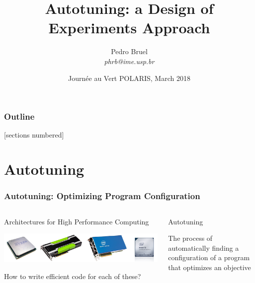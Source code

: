 \documentclass[10pt, compress, aspectratio=169, xcolor={table,usenames,dvipsnames}]{beamer}
\title{Autotuning: a Design of Experiments Approach}
\author{\footnotesize Pedro Bruel \\ {\scriptsize \emph{phrb@ime.usp.br}}}
\date{\scriptsize Journée au Vert POLARIS, March 2018}
\begin{document}
\maketitle

\begin{frame}
    \frametitle{Outline}
    [sections numbered]
    \tableofcontents[hideallsubsections]
\end{frame}

\section{Autotuning}

\begin{frame}
    \frametitle{Autotuning: Optimizing Program Configuration}
    \begin{columns}[c]
            \begin{block}{Architectures for High Performance Computing}
                \begin{center}
                    \includegraphics[width=\columnwidth]{architectures}
                \end{center}

                How to write \alert{efficient code} for each of these?
            \end{block}

            \begin{block}{Autotuning}

                \vspace{.2cm}

                The process of \alert{automatically finding} a
                \alert{configuration} of a program that optimizes an
                \alert{objective}
            \end{block}


\end{columns}
\end{frame}
\end{document}
